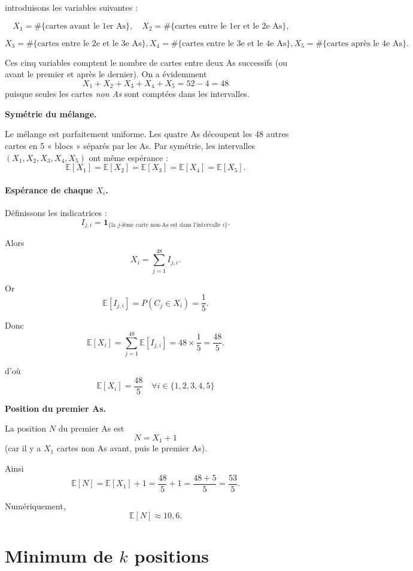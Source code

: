 introduisons les variables suivantes :

\[
X_1 = \#\{\text{cartes avant le 1er As}\}, \quad
X_2 = \#\{\text{cartes entre le 1er et le 2e As}\}, \quad
\]

\[
X_3 = \#\{\text{cartes entre le 2e et le 3e As}\},
X_4 = \#\{\text{cartes entre le 3e et le 4e As}\},
X_5 = \#\{\text{cartes après le 4e As}\}.
\]

Ces cinq variables comptent le nombre de cartes
entre deux As successifs (ou avant le premier et après le dernier).
On a évidemment
\[
X_1 + X_2 + X_3 + X_4 + X_5 = 52 - 4 = 48
\]
puisque seules les cartes \emph{non As} sont comptées dans les intervalles.

\medskip
\textbf{Symétrie du mélange.}

Le mélange est parfaitement uniforme.
Les quatre As découpent les 48 autres cartes en 5 « blocs »
séparés par les As.
Par symétrie, les intervalles
\((X_1,X_2,X_3,X_4,X_5)\)
ont même espérance :
\[
\mathbb{E}[X_1] = \mathbb{E}[X_2] = \mathbb{E}[X_3]
= \mathbb{E}[X_4] = \mathbb{E}[X_5].
\]

\paragraph{Espérance de chaque $X_i$.}

Définissons les indicatrices :
\[
I_{j,i} = \mathbf{1}_{\{\text{la $j$-ième carte non-As est dans l’intervalle $i$}\}}.
\]

Alors
\[
X_i = \sum_{j=1}^{48} I_{j,i}.
\]

Or
\[
\mathbb{E}[I_{j,i}] = P(C_j \in X_i) = \frac{1}{5}.
\]

Donc
\[
\mathbb{E}[X_i]
= \sum_{j=1}^{48} \mathbb{E}[I_{j,i}]
= 48 \times \frac{1}{5}
= \frac{48}{5}.
\]

d’où
\[
\boxed{
\mathbb{E}[X_i]  = \frac{48}{5} 
} \quad \forall i \in \{1,2,3,4,5\}\]

\medskip
\textbf{Position du premier As.}

La position $N$ du premier As est
\[
N = X_1 + 1
\]
(car il y a $X_1$ cartes non As avant, puis le premier As).

Ainsi
\[
\mathbb{E}[N]
= \mathbb{E}[X_1] + 1
= \frac{48}{5} + 1
= \frac{48 + 5}{5}
= \boxed{\displaystyle \frac{53}{5}}.
\]

\medskip
Numériquement,
\[
\mathbb{E}[N] \approx 10,6.
\]


\section{Minimum de $k$ positions}

